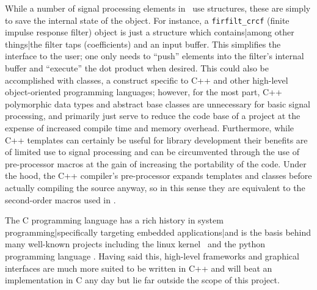 While a number of signal processing elements in \liquid\ use structures, these
are simply to save the internal state of the object.
For instance, a {\tt firfilt\_crcf} (finite impulse response filter) object
is just a structure which contains|among other things|the filter taps
(coefficients) and an input buffer.
This simplifies the interface to the user; one only needs to ``push'' elements
into the filter's internal buffer and ``execute'' the dot product when
desired.
This could also be accomplished with classes, a construct specific to C++ and
other high-level object-oriented programming languages;
however,
for the most part, C++ polymorphic data types and abstract base classes are
unnecessary for basic signal processing, and primarily just serve to reduce
the code base of a project at the expense of increased compile time and
memory overhead.
Furthermore, while C++ templates can certainly be useful for library
development
their benefits are of limited use to signal processing and can be circumvented
through the use of pre-processor macros at the gain of increasing the
portability of the code.
Under the hood, the C++ compiler's pre-processor expands templates and classes
before actually compiling the source anyway, so in this sense they are
equivalent to the second-order macros used in \liquid.

The C programming language has a rich history in system
programming|specifically targeting embedded applications|and is the
basis behind many well-known projects including the linux
kernel~\cite{linux-kernel:web}
and the python programming language \cite{python:web}.
Having said this, high-level frameworks and graphical interfaces are
much more suited to be written in C++ and will beat an implementation in
C any day but lie far outside the scope of this project.

